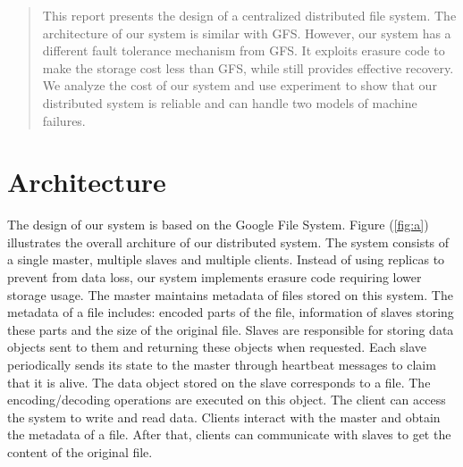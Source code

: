 \documentclass[conference]{IEEEtran}
\begin{document}
\begin{abstract}
\boldmath
This report presents the design of a centralized distributed file system. The architecture of our system is similar with GFS\cite{gfs}. However, our system has a different fault tolerance mechanism from GFS. It exploits erasure code to make the  storage cost less than GFS, while still provides effective recovery. We analyze the cost of our system and use experiment to show that our distributed system is reliable and can handle two models of machine failures.
\end{abstract}





%
\IEEEpeerreviewmaketitle

\section{Architecture}
The design of our system is based on the Google File System\cite{gfs}. Figure (\ref{fig:a}) illustrates the overall architure of our distributed system.
The system consists of a single master, multiple slaves and  multiple clients. Instead of using replicas to prevent from data loss, our system implements erasure code requiring lower storage usage. The master maintains metadata of files stored on this system. The metadata of a file includes: encoded parts of the file, information of slaves storing these parts and the size of the original file. Slaves are responsible for storing data objects sent to them and returning these objects when requested. Each slave periodically sends its state to the master through heartbeat messages to claim that it is alive. The data object stored on the slave corresponds to a file. The encoding/decoding operations are executed on this object. The client can access the system to write and read data.
Clients interact with the master and obtain the metadata of a file. After that, clients can communicate with slaves to get the content of the original file.
\end{document}
